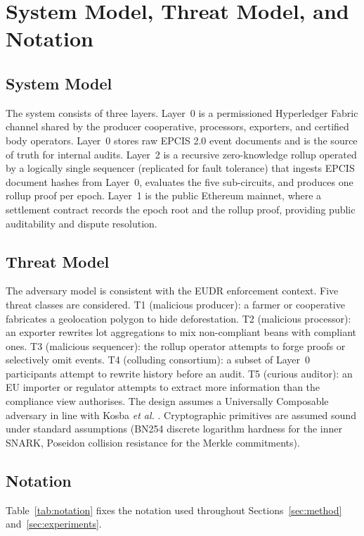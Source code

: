 \documentclass[journal]{IEEEtran}
\begin{document}
\section{System Model, Threat Model, and Notation}
\label{sec:model}

\subsection{System Model}
The system consists of three layers. Layer~0 is a permissioned Hyperledger Fabric channel shared by the producer cooperative, processors, exporters, and certified body operators. Layer~0 stores raw EPCIS 2.0 event documents and is the source of truth for internal audits. Layer~2 is a recursive zero-knowledge rollup operated by a logically single sequencer (replicated for fault tolerance) that ingests EPCIS document hashes from Layer~0, evaluates the five sub-circuits, and produces one rollup proof per epoch. Layer~1 is the public Ethereum mainnet, where a settlement contract records the epoch root and the rollup proof, providing public auditability and dispute resolution.

\subsection{Threat Model}
The adversary model is consistent with the EUDR enforcement context. Five threat classes are considered. T1 (malicious producer): a farmer or cooperative fabricates a geolocation polygon to hide deforestation. T2 (malicious processor): an exporter rewrites lot aggregations to mix non-compliant beans with compliant ones. T3 (malicious sequencer): the rollup operator attempts to forge proofs or selectively omit events. T4 (colluding consortium): a subset of Layer~0 participants attempt to rewrite history before an audit. T5 (curious auditor): an EU importer or regulator attempts to extract more information than the compliance view authorises. The design assumes a Universally Composable adversary in line with Kosba \emph{et al.} \cite{kosba2016hawk}. Cryptographic primitives are assumed sound under standard assumptions (BN254 discrete logarithm hardness for the inner SNARK, Poseidon collision resistance for the Merkle commitments).

\subsection{Notation}
Table~\ref{tab:notation} fixes the notation used throughout Sections~\ref{sec:method} and~\ref{sec:experiments}.
\end{document}
